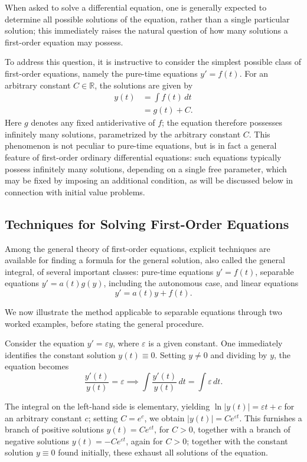 When asked to solve a differential equation, one is generally expected to determine all possible solutions of the equation, rather than a single particular solution; this immediately raises the natural question of how many solutions a first-order equation may possess.


To address this question, it is instructive to consider the simplest possible class of first-order equations, namely the pure-time equations $y' = f(t)$. For an arbitrary constant $C \in \mathbb{R}$, the solutions are given by
\[
\begin{aligned}
y(t) &= \int f(t) \, dt \\
&= g(t) + C.
\end{aligned}
\]
Here $g$ denotes any fixed antiderivative of $f$; the equation therefore possesses infinitely many solutions, parametrized by the arbitrary constant $C$. This phenomenon is not peculiar to pure-time equations, but is in fact a general feature of first-order ordinary differential equations: such equations typically possess infinitely many solutions, depending on a single free parameter, which may be fixed by imposing an additional condition, as will be discussed below in connection with initial value problems.



\subsection{Techniques for Solving First-Order Equations}

Among the general theory of first-order equations, explicit techniques are available for finding a formula for the general solution, also called the general integral, of several important classes: pure-time equations $y' = f(t)$, separable equations $y' = a(t) g(y)$, including the autonomous case, and linear equations
\[
y' = a(t) y + f(t).
\]

We now illustrate the method applicable to separable equations through two worked examples, before stating the general procedure.

\begin{example}
Consider the equation $y' = \varepsilon y$, where $\varepsilon$ is a given constant. One immediately identifies the constant solution $y(t) \equiv 0$. Setting $y \neq 0$ and dividing by $y$, the equation becomes
\[
\frac{y'(t)}{y(t)} = \varepsilon \implies \int \frac{y'(t)}{y(t)} \, dt = \int \varepsilon \, dt.
\]

The integral on the left-hand side is elementary, yielding $\ln |y(t)| = \varepsilon t + c$ for an arbitrary constant $c$; setting $C = e^c$, we obtain $|y(t)| = C e^{\varepsilon t}$. This furnishes a branch of positive solutions $y(t) = C e^{\varepsilon t}$, for $C > 0$, together with a branch of negative solutions $y(t) = -C e^{\varepsilon t}$, again for $C > 0$; together with the constant solution $y \equiv 0$ found initially, these exhaust all solutions of the equation.
\end{example}

